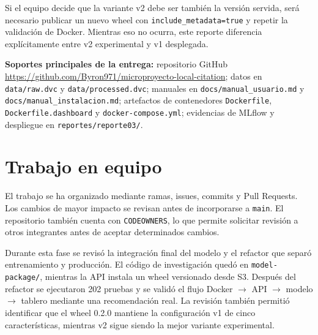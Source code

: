 \documentclass[9pt]{article}
\newcommand{\notabox}[1]{
\begin{tcolorbox}[
    colback=lightgray,
    colframe=accentblue,
    boxrule=0.5pt,
    left=5pt,
    right=5pt,
    top=3pt,
    bottom=3pt,
    arc=1pt
]
\footnotesize #1
\end{tcolorbox}
}
\newcommand{\pendingbox}[1]{
\begin{tcolorbox}[
    colback=orange!5,
    colframe=warningorange,
    boxrule=0.5pt,
    left=5pt,
    right=5pt,
    top=3pt,
    bottom=3pt,
    arc=1pt
]
\footnotesize #1
\end{tcolorbox}
}
\begin{document}
\pendingbox{
Si el equipo decide que la variante v2 debe ser también la versión
servida, será necesario publicar un nuevo wheel con
\texttt{include\_metadata=true} y repetir la validación de Docker. Mientras eso
no ocurra, este reporte diferencia explícitamente entre v2 experimental y v1
desplegada.
}

\notabox{
\textbf{Soportes principales de la entrega:}
repositorio GitHub \url{https://github.com/Byron971/microproyecto-local-citation};
datos en \texttt{data/raw.dvc} y \texttt{data/processed.dvc};
manuales en \texttt{docs/manual\_usuario.md} y
\texttt{docs/manual\_instalacion.md}; artefactos de contenedores
\texttt{Dockerfile}, \texttt{Dockerfile.dashboard} y
\texttt{docker-compose.yml}; evidencias de MLflow y despliegue en
\texttt{reportes/reporte03/}.
}


\clearpage

\section{Trabajo en equipo}

El trabajo se ha organizado mediante ramas, issues, commits y Pull Requests.
Los cambios de mayor impacto se revisan antes de incorporarse a
\texttt{main}. El repositorio también cuenta con \texttt{CODEOWNERS}, lo que
permite solicitar revisión a otros integrantes antes de aceptar determinados
cambios.

Durante esta fase se revisó la integración final del modelo y el refactor que
separó entrenamiento y producción. El código de investigación quedó en
\texttt{model-package/}, mientras la API instala un wheel versionado desde S3.
Después del refactor se ejecutaron 202 pruebas y se validó el flujo
Docker $\rightarrow$ API $\rightarrow$ modelo $\rightarrow$ tablero mediante
una recomendación real. La revisión también permitió identificar que el wheel
0.2.0 mantiene la configuración v1 de cinco características, mientras v2 sigue
siendo la mejor variante experimental.
\end{document}
